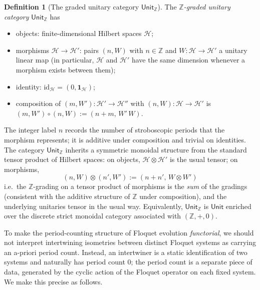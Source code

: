 \documentclass[12pt]{article}
\theoremstyle{definition}
\newtheorem{definition}[theorem]{Definition}
\theoremstyle{remark}
\newcommand{\Hcal}{\mathcal{H}}
\newcommand{\Z}{\mathbb{Z}}
\newcommand{\one}{\mathbf{1}}
\begin{document}
\begin{definition}[The graded unitary category $\mathsf{Unit}_{\Z}$]
\label{def:unit-z}
The \emph{$\Z$-graded unitary category} $\mathsf{Unit}_{\Z}$ has
\begin{itemize}
\item objects: finite-dimensional Hilbert spaces $\Hcal$;
\item morphisms $\Hcal\to\Hcal'$: pairs $(n,W)$ with $n\in\Z$ and $W\colon\Hcal\to\Hcal'$ a unitary linear map (in particular, $\Hcal$ and $\Hcal'$ have the same dimension whenever a morphism exists between them);
\item identity: $\mathrm{id}_{\Hcal}=(0,\one_{\Hcal})$;
\item composition of $(m,W')\colon\Hcal'\to\Hcal''$ with $(n,W)\colon\Hcal\to\Hcal'$ is
$(m,W')\circ(n,W) := (n+m,\,W'\,W)$.
\end{itemize}
The integer label $n$ records the number of stroboscopic periods that the morphism represents; it is additive under composition and trivial on identities. The category $\mathsf{Unit}_{\Z}$ inherits a symmetric monoidal structure from the standard tensor product of Hilbert spaces: on objects, $\Hcal\otimes\Hcal'$ is the usual tensor; on morphisms,
\begin{equation*}
(n,W)\otimes(n',W') := (n+n',\,W\otimes W')
\end{equation*}
i.e.\ the $\Z$-grading on a tensor product of morphisms is the \emph{sum} of the gradings (consistent with the additive structure of $\Z$ under composition), and the underlying unitaries tensor in the usual way. Equivalently, $\mathsf{Unit}_{\Z}$ is $\mathsf{Unit}$ enriched over the discrete strict monoidal category associated with $(\Z,+,0)$.
\end{definition}

To make the period-counting structure of Floquet evolution \emph{functorial}, we should not interpret intertwining isometries between distinct Floquet systems as carrying an a-priori period count. Instead, an intertwiner is a static identification of two systems and naturally has period count $0$; the period count is a separate piece of data, generated by the cyclic action of the Floquet operator on each fixed system. We make this precise as follows.
\end{document}
